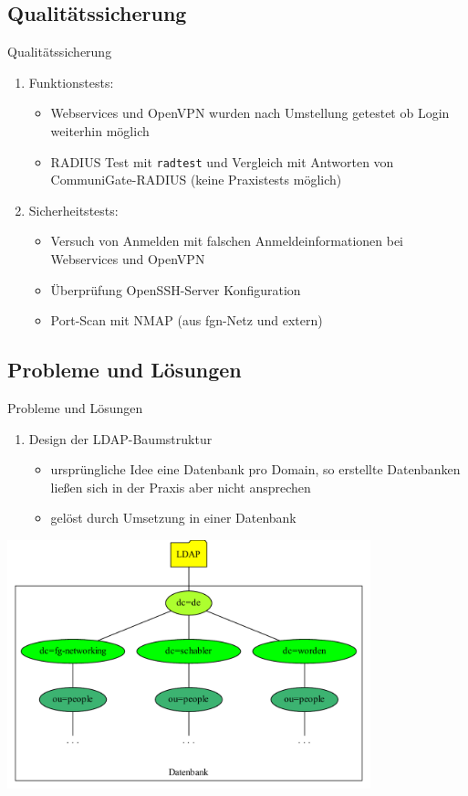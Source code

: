 \documentclass[handout,svgnames]{beamer}
\begin{document}
\subsection{Qualitätssicherung}
\begin{frame}{Qualitätssicherung}
\begin{enumerate}
	\item Funktionstests:
	\begin{itemize}
		\item Webservices und OpenVPN wurden nach Umstellung getestet ob Login weiterhin möglich
		\item RADIUS Test mit \texttt{radtest} und Vergleich mit Antworten von CommuniGate-RADIUS (keine Praxistests möglich)
	\end{itemize}
	\item Sicherheitstests:
	\begin{itemize}
		\item Versuch von Anmelden mit falschen Anmeldeinformationen bei Webservices und OpenVPN
		\item Überprüfung OpenSSH-Server Konfiguration
		\item Port-Scan mit NMAP (aus fgn-Netz und extern)
	\end{itemize}
\end{enumerate}
\end{frame}


\subsection{Probleme und Lösungen}
\begin{frame}{Probleme und Lösungen}
\begin{enumerate}
	\item Design der LDAP-Baumstruktur
	\begin{itemize}
		\item ursprüngliche Idee eine Datenbank pro Domain, so erstellte Datenbanken ließen sich in der Praxis aber nicht ansprechen
		\item gelöst durch Umsetzung in einer Datenbank
	\end{itemize}
\end{enumerate}
\centering
\includegraphics[width=0.79\textwidth]{Bilder/LDAP-fgn.pdf}
\end{frame}
\end{document}
